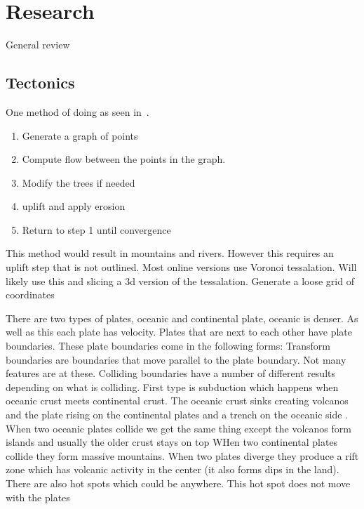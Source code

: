 \documentclass[11pt]{article}
\begin{document}
    \section{Research}
    General review~\cite{galin2019review}

    \subsection{Tectonics}
    One method of doing as seen in~\cite{cordonnier2016large}.
    \begin{enumerate}
        \item Generate a graph of points
        \item Compute flow between the points in the graph.
        \item Modify the trees if needed
        \item uplift and apply erosion
        \item Return to step 1 until convergence
    \end{enumerate}
    This method would result in mountains and rivers.
    However this requires an uplift step that is not outlined.
    Most online versions use Voronoi tessalation.
    Will likely use this and slicing a 3d version of the tessalation.
    Generate a loose grid of coordinates

    There are two types of plates, oceanic and continental plate, oceanic is denser.
    As well as this each plate has velocity.
    Plates that are next to each other have plate boundaries.
    These plate boundaries come in the following forms:
    Transform boundaries are boundaries that move parallel to the plate boundary.
    Not many features are at these.
    Colliding boundaries have a number of different results depending on what is colliding.
    First type is subduction which happens when oceanic crust meets continental crust.
    The oceanic crust sinks creating volcanos and the plate rising on the continental plates and a trench on the oceanic side .
    When two oceanic plates collide we get the same thing except the volcanos form islands and usually the older crust stays on top
    WHen two continental plates collide they form massive mountains.
    When two plates diverge they produce a rift zone which has volcanic activity in the center (it also forms dips in the land).
    There are also hot spots which could be anywhere.
    This hot spot does not move with the plates
\end{document}
